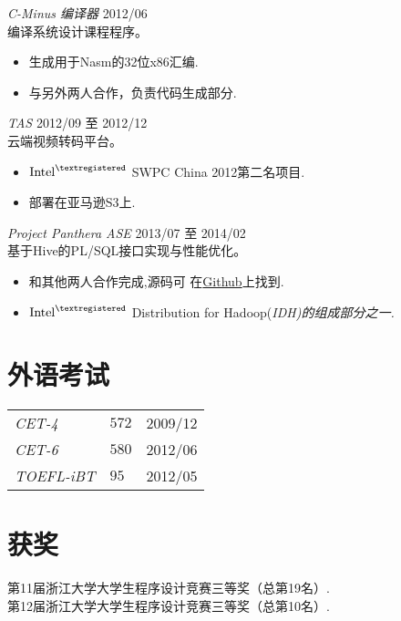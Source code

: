 \documentclass[line,margin]{res}
\begin{document}
\begin{resume}
                {\sl C-Minus 编译器} \hfill        2012/06 \\
                编译系统设计课程程序。
                  \begin{itemize}
                   \item 生成用于Nasm的32位x86汇编.
                   \item 与另外两人合作，负责代码生成部分.
                   \end{itemize}
                {\sl TAS} \hfill        2012/09 至 2012/12\\
                云端视频转码平台。
                  \begin{itemize}
                   \item $\textrm{Intel}^{\textregistered}$ SWPC China 2012第二名项目.
                   \item 部署在亚马逊S3上.
                   \end{itemize}
                   
                {\sl Project Panthera ASE} \hfill            2013/07 至 2014/02 \\
                基于Hive的PL/SQL接口实现与性能优化。
                 \begin{itemize}  \itemsep -2pt %
                 \item 和其他两人合作完成,源码可
                     在\href{https://github.com/intel-hadoop/project-panthera}{Github}上找到.
                 \item $\textrm{Intel}^{\textregistered}$ Distribution for Hadoop(\sl IDH)的组成部分之一.
                 \end{itemize}

\section{外语考试}
\begin{tabular}{p{}p{}p{}}
{\sl CET-4} &{$572$} &{\hfill 2009/12}\\
{\sl CET-6} &{$580$} &{\hfill 2012/06}\\
{\sl TOEFL-iBT} &{$95$} &{\hfill 2012/05}
\end{tabular}
\section{获奖}
            第11届浙江大学大学生程序设计竞赛三等奖（总第19名）.\\
            第12届浙江大学大学生程序设计竞赛三等奖（总第10名）.


\end{resume}
\end{document}

